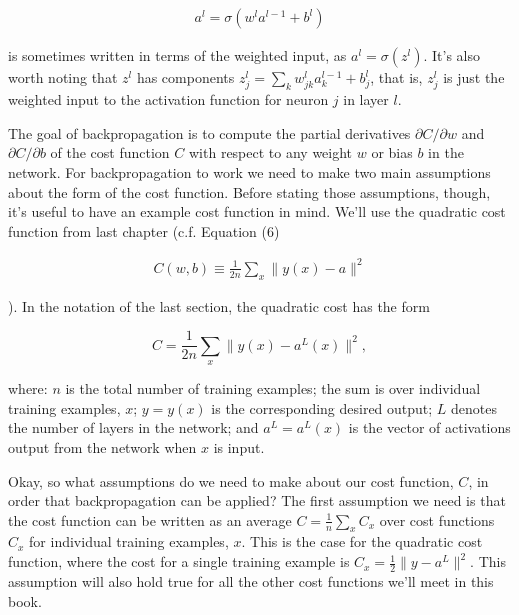 \begin{align*}
a^{l} = \sigma(w^l a^{l-1}+b^l) \nonumber
\end{align*}

\noindent is sometimes written in terms of the weighted input, as $a^l = \sigma(z^l)$. It's also worth noting that $z^l$ has components $z^l_j = \sum_k w^l_{jk} a^{l-1}_k+b^l_j$, that is, $z^l_j$ is just the weighted input to the activation function for neuron $j$ in layer $l$.





The goal of backpropagation is to compute the partial derivatives $\partial C / \partial w$ and $\partial C / \partial b$ of the cost function $C$ with respect to any weight $w$ or bias $b$ in the network. For backpropagation to work we need to make two main assumptions about the form of the cost function. Before stating those assumptions, though, it's useful to have an example cost function in mind. We'll use the quadratic cost function from last chapter (c.f. Equation (6)

\begin{align*}
C(w,b) \equiv \frac{1}{2n} \sum_x \| y(x) - a\|^2 \nonumber
\end{align*}

\noindent ). In the notation of the last section, the quadratic cost has the form

\begin{equation}
C = \frac{1}{2n} \sum_x \|y(x)-a^L(x)\|^2,
\tag{26}
\end{equation}

\noindent where: $n$ is the total number of training examples; the sum is over individual training examples, $x$; $y = y(x)$ is the corresponding desired output; $L$ denotes the number of layers in the network; and $a^L = a^L(x)$ is the vector of activations output from the network when $x$ is input.


Okay, so what assumptions do we need to make about our cost function, $C$, in order that backpropagation can be applied? The first assumption we need is that the cost function can be written as an average $C = \frac{1}{n} \sum_x C_x$ over cost functions $C_x$ for individual training examples, $x$. This is the case for the quadratic cost function, where the cost for a single training example is $C_x = \frac{1}{2} \|y-a^L \|^2$. This assumption will also hold true for all the other cost functions we'll meet in this book.


